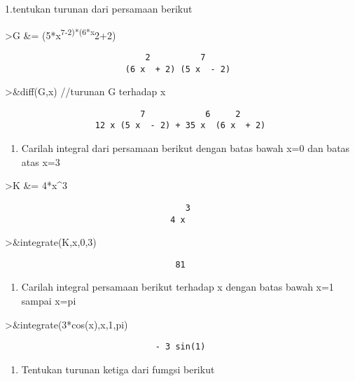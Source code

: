 \documentclass[
]{book}
\providecommand{\tightlist}{%
  \setlength{\itemsep}{0pt}\setlength{\parskip}{0pt}}
\begin{document}
1.tentukan turunan dari persamaan berikut

\textgreater G \&= (5*x\textsuperscript{7-2)*(6*x}2+2)

\begin{verbatim}
                            2          7
                        (6 x  + 2) (5 x  - 2)
\end{verbatim}

\textgreater\&diff(G,x) //turunan G terhadap x

\begin{verbatim}
                           7            6     2
                  12 x (5 x  - 2) + 35 x  (6 x  + 2)
\end{verbatim}

\begin{enumerate}
\def\labelenumi{\arabic{enumi}.}
\setcounter{enumi}{1}
\tightlist
\item
  Carilah integral dari persamaan berikut dengan batas bawah x=0 dan batas atas x=3
\end{enumerate}

\textgreater K \&= 4*x\^{}3

\begin{verbatim}
                                    3
                                 4 x
\end{verbatim}

\textgreater\&integrate(K,x,0,3)

\begin{verbatim}
                                  81
\end{verbatim}

\begin{enumerate}
\def\labelenumi{\arabic{enumi}.}
\setcounter{enumi}{2}
\tightlist
\item
  Carilah integral persamaan berikut terhadap x dengan batas bawah x=1 sampai x=pi
\end{enumerate}

\textgreater\&integrate(3*cos(x),x,1,pi)

\begin{verbatim}
                              - 3 sin(1)
\end{verbatim}

\begin{enumerate}
\def\labelenumi{\arabic{enumi}.}
\setcounter{enumi}{3}
\tightlist
\item
  Tentukan turunan ketiga dari fumgsi berikut
\end{enumerate}
\end{document}
